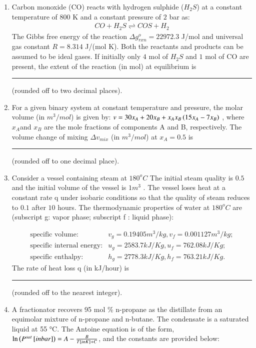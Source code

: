 \documentclass[journal,12pt,onecolumn]{IEEEtran}
\theoremstyle{remark}
\begin{document}
\begin{enumerate}
\hfill{}
    \item Carbon monoxide (CO) reacts with hydrogen sulphide ($H_2S$) at a constant temperature of $800$ K and a constant pressure of $2$ bar as: 
    \begin{align*}
        CO + H_2S \rightleftharpoons COS + H_2
    \end{align*}
    The Gibbs free energy of the reaction $\Delta g^{o}_{rxn} = 22972.3$ J/mol and universal gas constant $R = 8.314$ J/(mol K). Both the reactants and products can be assumed to be ideal gases. If initially only $4$ mol of $H_2S$ and $1$ mol of CO are present, the extent of the reaction (in mol) at equilibrium is \rule{1.5cm}{0.1mm}(rounded off to two decimal places).
    
\hfill{}
    \item For a given binary system at constant temperature and pressure, the molar volume (in $m^3/mol$) is given by: $v = 30x_A + 20x_B + x_Ax_B\left(15x_A - 7x_B\right)$ , where $x_A $and $x_B$ are the mole fractions of components A and B, respectively. The volume change of mixing $\Delta v_{mix}$ (in $m^3/mol$) at $x_A = 0.5$ is \rule{1.5cm}{0.1mm}(rounded off to one decimal place). 
    
\hfill{}
\newpage
    \item Consider a vessel containing steam at $180^oC$ The initial steam quality is $0.5$ and the initial volume of the vessel is $1 m^3$ . The vessel loses heat at a constant rate q under isobaric conditions so that the quality of steam reduces to $0.1$ after $10$ hours. The thermodynamic properties of water at $180^oC$ are (subscript g: vapor phase; subscript f : liquid phase): 
    
    \begin{align*}
        \text{specific volume:} & v_g = 0.19405 m^3/kg,  v_f = 0.001127 m^3/kg; \\
        \text{specific internal energy:} & u_g = 2583.7 kJ/Kg,  u_f = 762.08 kJ/Kg;\\
        \text{specific enthalpy:} & h_g = 2778.3 kJ/Kg,  h_f = 763.21 kJ/Kg.
    \end{align*} 
    The rate of heat loss q (in kJ/hour) is \rule{2cm}{0.1mm}(rounded off to the nearest integer).
    
\hfill{}
    \item A fractionator recovers 95 mol \% n-propane as the distillate from an equimolar mixture of n-propane and n-butane. The condensate is a saturated liquid at 55 °C. The Antoine equation is of the form, $\ln\left(P^{sat}{}\left[in bar\right]\right) = A - \frac{B}{T{}\left[in K\right] + C}$, and the constants are provided below: 


\end{enumerate}
\end{document}
